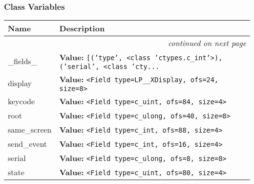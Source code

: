 
  \subsubsection{Class Variables}

    \vspace{-1cm}
\hspace{\varindent}\begin{longtable}{|p{\varnamewidth}|p{\vardescrwidth}|l}
\cline{1-2}
\cline{1-2} \centering \textbf{Name} & \centering \textbf{Description}& \\
\cline{1-2}
\endhead\cline{1-2}\multicolumn{3}{r}{\small\textit{continued on next page}}\\\endfoot\cline{1-2}
\endlastfoot\raggedright \_\-f\-i\-e\-l\-d\-s\-\_\- & \raggedright \textbf{Value:} 
{\tt \texttt{[}\texttt{(}\texttt{'}\texttt{type}\texttt{'}\texttt{, }{\textless}class 'ctypes.c\_int'{\textgreater}\texttt{)}\texttt{, }\texttt{(}\texttt{'}\texttt{serial}\texttt{'}\texttt{, }{\textless}class 'cty\texttt{...}}&\\
\cline{1-2}
\raggedright d\-i\-s\-p\-l\-a\-y\- & \raggedright \textbf{Value:} 
{\tt {\textless}Field type=LP\_\_XDisplay, ofs=24, size=8{\textgreater}}&\\
\cline{1-2}
\raggedright k\-e\-y\-c\-o\-d\-e\- & \raggedright \textbf{Value:} 
{\tt {\textless}Field type=c\_uint, ofs=84, size=4{\textgreater}}&\\
\cline{1-2}
\raggedright r\-o\-o\-t\- & \raggedright \textbf{Value:} 
{\tt {\textless}Field type=c\_ulong, ofs=40, size=8{\textgreater}}&\\
\cline{1-2}
\raggedright s\-a\-m\-e\-\_\-s\-c\-r\-e\-e\-n\- & \raggedright \textbf{Value:} 
{\tt {\textless}Field type=c\_int, ofs=88, size=4{\textgreater}}&\\
\cline{1-2}
\raggedright s\-e\-n\-d\-\_\-e\-v\-e\-n\-t\- & \raggedright \textbf{Value:} 
{\tt {\textless}Field type=c\_int, ofs=16, size=4{\textgreater}}&\\
\cline{1-2}
\raggedright s\-e\-r\-i\-a\-l\- & \raggedright \textbf{Value:} 
{\tt {\textless}Field type=c\_ulong, ofs=8, size=8{\textgreater}}&\\
\cline{1-2}
\raggedright s\-t\-a\-t\-e\- & \raggedright \textbf{Value:} 
{\tt {\textless}Field type=c\_uint, ofs=80, size=4{\textgreater}}&\\

\end{longtable}
